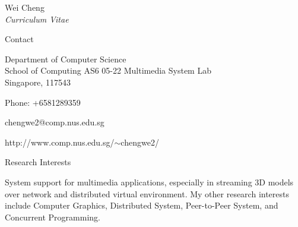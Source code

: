 \documentclass[10pt]{article}
\begin{document}


\newlength{\oldcvlabelwidth}
\renewcommand*{\cvbibname}{}

\begin{cv}{Wei Cheng\\{\large \itshape Curriculum Vitae}}

\begin{cvlist}{Contact}
	\item
	Department of Computer Science\\
	School of Computing
        AS6 05-22 Multimedia System Lab\\
        Singapore, 117543
	\item Phone: +6581289359
	\item chengwe2@comp.nus.edu.sg
	\item http://www.comp.nus.edu.sg/$\sim$chengwe2/
\end{cvlist}

\begin{cvlist}{Research Interests}
	\item System support for multimedia applications,
              especially in streaming 3D models over network and distributed virtual environment.
              My other research interests include Computer Graphics, Distributed System,
              Peer-to-Peer System, and Concurrent Programming.
\end{cvlist}


\end{cv}
\end{document}
